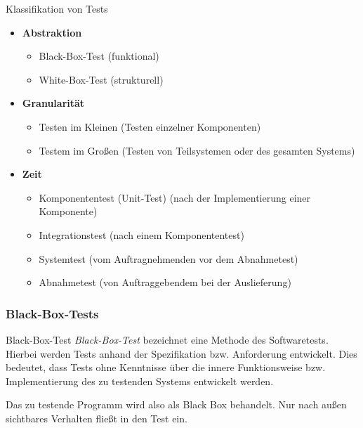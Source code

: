 \begin{defi}{Klassifikation von Tests}
    \begin{itemize}
        \item \textbf{Abstraktion}
              \begin{itemize}
                  \item Black-Box-Test (funktional)
                  \item White-Box-Test (strukturell)
              \end{itemize}
        \item \textbf{Granularität}
              \begin{itemize}
                  \item Testen im Kleinen (Testen einzelner Komponenten)
                  \item Testem im Großen (Testen von Teilsystemen oder des gesamten Systems)
              \end{itemize}
        \item \textbf{Zeit}
              \begin{itemize}
                  \item Komponententest (Unit-Test) (nach der Implementierung einer Komponente)
                  \item Integrationstest (nach einem Komponententest)
                  \item Systemtest (vom Auftragnehmenden vor dem Abnahmetest)
                  \item Abnahmetest (von Auftraggebendem bei der Auslieferung)
              \end{itemize}
    \end{itemize}
\end{defi}

\subsubsection{Black-Box-Tests}

\begin{defi}{Black-Box-Test}
    \emph{Black-Box-Test} bezeichnet eine Methode des Softwaretests.
    Hierbei werden Tests anhand der Spezifikation bzw. Anforderung entwickelt.
    Dies bedeutet, dass Tests ohne Kenntnisse über die innere Funktionsweise bzw. Implementierung des zu testenden Systems entwickelt werden.

    Das zu testende Programm wird also als Black Box behandelt.
    Nur nach außen sichtbares Verhalten fließt in den Test ein.
\end{defi}


